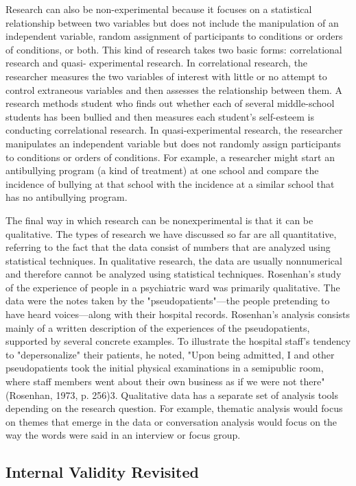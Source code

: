 Research can also be non-experimental because it focuses on a statistical relationship between two variables but does not include the manipulation of an independent variable, random assignment of participants to conditions or orders of conditions, or both. This kind of research takes two basic forms: correlational research and quasi- experimental research. In correlational research, the researcher measures the two variables of interest with little or no attempt to control extraneous variables and then assesses the relationship between them. A research methods student who finds out whether each of several middle-school students has been bullied and then measures each student's self-esteem is conducting correlational research. In quasi-experimental research, the researcher manipulates an independent variable but does not randomly assign participants to conditions or orders of conditions.
For example, a researcher might start an antibullying program (a kind of treatment) at one school and compare the incidence of bullying at that school with the incidence at a similar school that has no antibullying program.

The final way in which research can be nonexperimental is that it can be qualitative. The types of research we have discussed so far are all quantitative, referring to the fact that the data consist of numbers that are analyzed using statistical techniques. In qualitative research, the data are usually nonnumerical and therefore cannot be analyzed using statistical techniques. Rosenhan's study of the experience of people in a psychiatric ward was primarily qualitative. The data were the notes taken by the "pseudopatients"---the people pretending to have heard voices---along with their hospital records. Rosenhan's analysis consists mainly of a written description of the experiences of the pseudopatients, supported by several concrete examples. To illustrate the hospital staff's tendency to "depersonalize" their patients, he noted, "Upon being admitted, I and other pseudopatients took the initial physical examinations in a semipublic room, where staff members went about their own business as if we were not there" (Rosenhan, 1973, p. 256)3. Qualitative data has a separate set of analysis tools depending on the research question. For example, thematic analysis would focus on themes that emerge in the data or conversation analysis would focus on the way the words were said in an interview or focus group.

\subsection{Internal Validity Revisited}

